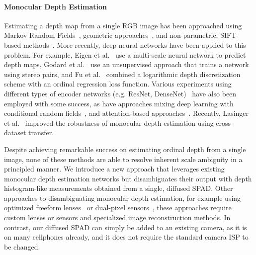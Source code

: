 

\paragraph{Monocular Depth Estimation}
%
Estimating a depth map from a single RGB image has been approached using Markov Random Fields~\cite{Saxena2006}, geometric approaches~\cite{Hoiem2005}, and non-parametric, SIFT-based methods~\cite{Karsch2014}. More recently, deep neural networks have been applied to this problem. For example, Eigen et al.~\cite{Eigen2014} use a multi-scale neural network to
predict depth maps, Godard et al.~\cite{Godard2017} use an unsupervised approach that trains a network using stereo pairs, and Fu et al.~\cite{Fu2018} combined a logarithmic depth discretization scheme with an ordinal regression loss function. Various experiments using different types of encoder networks (e.g. ResNet, DenseNet)~\cite{Laina2016,Alhashim2018} have also been employed with some success, as have approaches mixing deep learning with conditional random fields~\cite{Xu2017}, and attention-based approaches~\cite{Xu2018,Hao2018}. Recently, Lasinger et al.~\cite{Lasinger:2019} improved the robustness of monocular depth estimation using cross-dataset transfer.

Despite achieving remarkable success on estimating ordinal depth from a single image, none of these methods are able to resolve inherent scale ambiguity in a principled manner. We introduce a new approach that leverages existing monocular depth estimation networks but disambiguates their output with depth histogram-like measurements obtained from a single, diffused SPAD. Other approaches to disambiguating monocular depth estimation, for example using optimized freeform lenses~\cite{Wu:2019,Chang:2019:DeepOptics3D} or dual-pixel sensors~\cite{Garg:2019}, these approaches require custom lenses or sensors and specialized image reconstruction methods. In contrast, our diffused SPAD can simply be added to an existing camera, as it is on many cellphones already, and it does not require the standard camera ISP to be changed.

